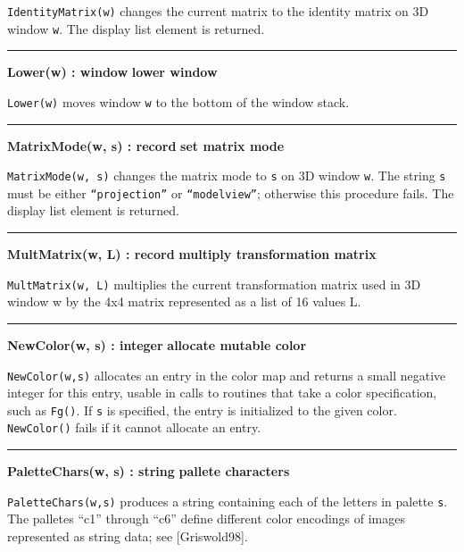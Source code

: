 \noindent
\texttt{IdentityMatrix(w)} changes the current matrix to the identity
matrix on 3D window \texttt{w}. The display list element is returned. 

\bigskip\hrule\vspace{0.1cm}
\noindent
{\bf Lower(w) : window } \hfill {\bf lower window}

\noindent
\texttt{Lower(w)} moves window \texttt{w} to the bottom of the window
stack.

\bigskip\hrule\vspace{0.1cm}
\noindent
{\bf MatrixMode(w, s) : record } \hfill {\bf set matrix mode}

\noindent
\texttt{MatrixMode(w, s)} changes the matrix mode to \texttt{s} on 3D
window \texttt{w}. The string \texttt{s} must be either
\texttt{{\textquotedblleft}projection{\textquotedblright}} or
\texttt{{\textquotedblleft}modelview{\textquotedblright}}; otherwise
this procedure fails. The display list element is returned.

\bigskip\hrule\vspace{0.1cm}
\noindent
{\bf MultMatrix(w, L) : record } \hfill {\bf multiply transformation matrix}

\noindent
\texttt{MultMatrix(w, L)} multiplies the current transformation matrix
used in 3D window w by the 4x4 matrix represented as a list of 16
values L.

\bigskip\hrule\vspace{0.1cm}
\noindent
{\bf NewColor(w, s) : integer } \hfill {\bf allocate mutable color}

\noindent
\texttt{NewColor(w,s)} allocates an entry in the color map and returns a
small negative integer for this entry, usable in calls to routines that
take a color specification, such as \texttt{Fg()}. If \texttt{s} is
specified, the entry is initialized to the given color.
\texttt{NewColor()} fails if it cannot allocate an entry.

\bigskip\hrule\vspace{0.1cm}
\noindent
{\bf PaletteChars(w, s) : string } \hfill {\bf pallete characters}

\noindent
\texttt{PaletteChars(w,s)} produces a string containing each of the
letters in palette \texttt{s}. The palletes
{\textquotedblleft}c1{\textquotedblright} through
{\textquotedblleft}c6{\textquotedblright} define different color
encodings of images represented as string data; see [Griswold98].

